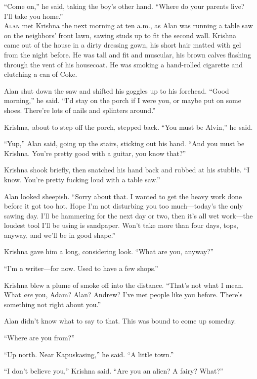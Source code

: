 \documentclass{article}
\begin{document}
``Come on,'' he said, taking the boy's other hand.  ``Where do your
parents live?  I'll take you home.''
\\
\lettrine[lines=3, lhang=.5, nindent=0pt, findent=2pt]{A}{lan} met Krishna the next morning at ten a.m., as Alan was running a
table saw on the neighbors' front lawn, sawing studs up to fit the
second wall.  Krishna came out of the house in a dirty dressing gown,
his short hair matted with gel from the night before.  He was tall and
fit and muscular, his brown calves flashing through the vent of his
housecoat.  He was smoking a hand-rolled cigarette and clutching a can
of Coke.

Alan shut down the saw and shifted his goggles up to his forehead. 
``Good morning,'' he said.  ``I'd stay on the porch if I were you, or
maybe put on some shoes.  There're lots of nails and splinters
around.''

Krishna, about to step off the porch, stepped back.  ``You must be
Alvin,'' he said.

``Yup,'' Alan said, going up the stairs, sticking out his hand.  ``And
you must be Krishna.  You're pretty good with a guitar, you know
that?''

Krishna shook briefly, then snatched his hand back and rubbed at his
stubble.  ``I know.  You're pretty fucking loud with a table saw.''

Alan looked sheepish.  ``Sorry about that.  I wanted to get the heavy
work done before it got too hot.  Hope I'm not disturbing you too
much---today's the only sawing day.  I'll be hammering for the next
day or two, then it's all wet work---the loudest tool I'll be using is
sandpaper.  Won't take more than four days, tops, anyway, and we'll be
in good shape.''

Krishna gave him a long, considering look.  ``What are you, anyway?''

``I'm a writer---for now.  Used to have a few shops.''

Krishna blew a plume of smoke off into the distance.  ``That's not
what I mean.  What \textit{are} you, Adam?  Alan?  Andrew?  I've met
people like you before.  There's something not right about you.''

Alan didn't know what to say to that.  This was bound to come up
someday.

``Where are you from?''

``Up north.  Near Kapuskasing,'' he said.  ``A little town.''

``I don't believe you,'' Krishna said.  ``Are you an alien?  A fairy? 
What?''
\end{document}
